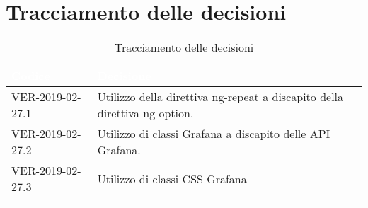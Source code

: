 
\section{Tracciamento delle decisioni}

\begin{longtable}{|C{.40\textwidth}|C{.60\textwidth}|}
\hline
{}\textbf{\textcolor{white}{Codice}} & \textbf{\textcolor{white}{Decisione}}\\
\hline
VER-2019-02-27.1 & Utilizzo della direttiva ng-repeat a discapito della direttiva ng-option.\\
\hline
{}VER-2019-02-27.2 & Utilizzo di classi Grafana a discapito delle API Grafana. \\
\hline
VER-2019-02-27.3 & Utilizzo di classi CSS Grafana \\
\hline

\caption{Tracciamento delle decisioni}
\end{longtable}
